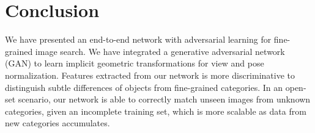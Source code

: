 \documentclass[runningheads]{llncs}
\begin{document}
\section{Conclusion}\label{sec:conclusion}

We have presented an end-to-end network with adversarial learning for fine-grained image search. 
We have integrated a generative adversarial network (GAN) to learn implicit geometric transformations for view and pose normalization. 
Features extracted from our network is more discriminative to distinguish subtle differences of objects from fine-grained categories.
In an open-set scenario, our network is able to correctly match unseen images from unknown categories, given an incomplete training set, which is more scalable as data from new categories accumulates. 




\end{document}
